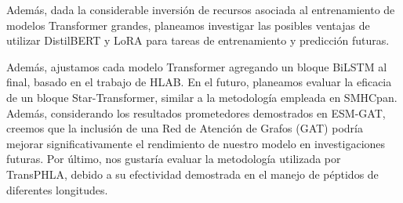Además, dada la considerable inversión de recursos asociada al entrenamiento de modelos Transformer grandes, planeamos investigar las posibles ventajas de utilizar DistilBERT y LoRA para tareas de entrenamiento y predicción futuras.

Además, ajustamos cada modelo Transformer agregando un bloque BiLSTM al final, basado en el trabajo de HLAB. En el futuro, planeamos evaluar la eficacia de un bloque Star-Transformer, similar a la metodología empleada en SMHCpan. Además, considerando los resultados prometedores demostrados en ESM-GAT, creemos que la inclusión de una Red de Atención de Grafos (GAT) podría mejorar significativamente el rendimiento de nuestro modelo en investigaciones futuras. Por último, nos gustaría evaluar la metodología utilizada por TransPHLA, debido a su efectividad demostrada en el manejo de péptidos de diferentes longitudes.